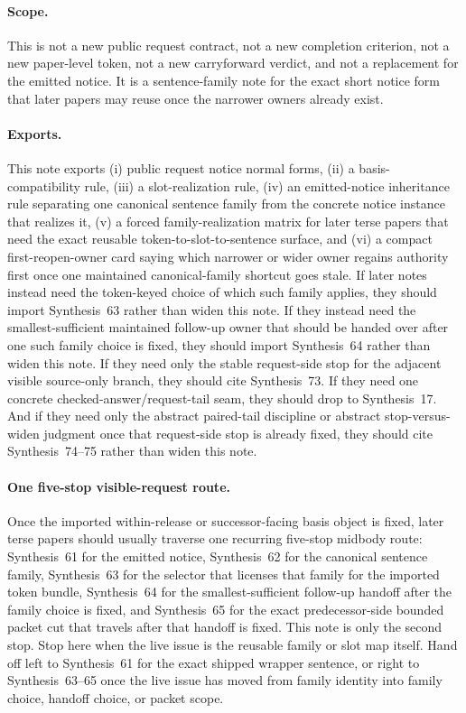 \documentclass[11pt]{article}
\begin{document}
\paragraph{Scope.}
This is not a new public request contract, not a new completion criterion, not a new paper-level token, not a new carryforward verdict, and not a replacement for the emitted notice.
It is a sentence-family note for the exact short notice form that later papers may reuse once the narrower owners already exist.

\paragraph{Exports.}
This note exports (i) public request notice normal forms, (ii) a basis-compatibility rule, (iii) a slot-realization rule, (iv) an emitted-notice inheritance rule separating one canonical sentence family from the concrete notice instance that realizes it, (v) a forced family-realization matrix for later terse papers that need the exact reusable token-to-slot-to-sentence surface, and (vi) a compact first-reopen-owner card saying which narrower or wider owner regains authority first once one maintained canonical-family shortcut goes stale. If later notes instead need the token-keyed choice of which such family applies, they should import Synthesis~63 rather than widen this note. If they instead need the smallest-sufficient maintained follow-up owner that should be handed over after one such family choice is fixed, they should import Synthesis~64 rather than widen this note. If they need only the stable request-side stop for the adjacent visible source-only branch, they should cite Synthesis~73. If they need one concrete checked-answer/request-tail seam, they should drop to Synthesis~17. And if they need only the abstract paired-tail discipline or abstract stop-versus-widen judgment once that request-side stop is already fixed, they should cite Synthesis~74--75 rather than widen this note.


\paragraph{One five-stop visible-request route.}
Once the imported within-release or successor-facing basis object is fixed, later terse papers should usually traverse one recurring five-stop midbody route: Synthesis~61 for the emitted notice, Synthesis~62 for the canonical sentence family, Synthesis~63 for the selector that licenses that family for the imported token bundle, Synthesis~64 for the smallest-sufficient follow-up handoff after the family choice is fixed, and Synthesis~65 for the exact predecessor-side bounded packet cut that travels after that handoff is fixed. This note is only the second stop. Stop here when the live issue is the reusable family or slot map itself. Hand off left to Synthesis~61 for the exact shipped wrapper sentence, or right to Synthesis~63--65 once the live issue has moved from family identity into family choice, handoff choice, or packet scope.
\end{document}
